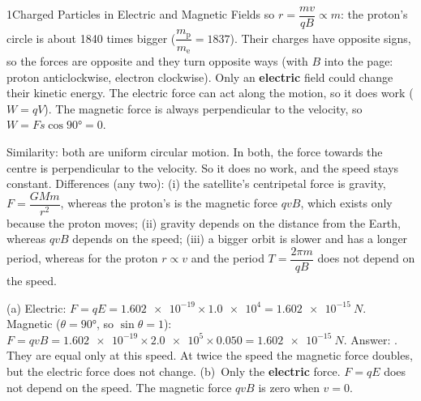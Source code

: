 \begin{chapteranswers}{1}{Charged Particles in Electric and Magnetic Fields}
        so $r = \dfrac{mv}{qB} \propto m$: the proton's circle is about 1840 times
        bigger ($\dfrac{m_\mathrm{p}}{m_\mathrm{e}} = 1837$). Their charges have
        opposite signs, so the forces are opposite and they turn opposite ways
        (with $B$ into the page: proton anticlockwise, electron clockwise).
        Only an \textbf{electric} field could change their kinetic energy. The
        electric force can act along the motion, so it does work ($W = qV$). The
        magnetic force is always perpendicular to the velocity, so
        $W = Fs\cos\ang{90} = 0$.
  \item Similarity: both are uniform circular motion. In both, the force
        towards the centre is perpendicular to the velocity. So it does no work,
        and the speed stays constant. Differences (any two): (i) the satellite's
        centripetal force is gravity, $F = \dfrac{GMm}{r^2}$, whereas the
        proton's is the magnetic force $qvB$, which exists only because the
        proton moves; (ii) gravity depends on the distance from the Earth,
        whereas $qvB$ depends on the speed; (iii) a bigger orbit is slower and
        has a longer period, whereas for the proton $r \propto v$ and the
        period $T = \dfrac{2\pi m}{qB}$ does not depend on the speed.
  \item (a) Electric: $F = qE = \num{1.602e-19} \times \num{1.0e4}
        = \qty{1.602e-15}{N}$. Magnetic ($\theta = \ang{90}$, so
        $\sin\theta = 1$): $F = qvB = \num{1.602e-19} \times \num{2.0e5}
        \times 0.050 = \qty{1.602e-15}{N}$.
        Answer: . They are equal only
        at this speed. At twice the speed the magnetic force doubles, but the
        electric force does not change.
        (b)~Only the \textbf{electric} force. $F = qE$ does not depend on the
        speed. The magnetic force $qvB$ is zero when $v = 0$.
\end{chapteranswers}
